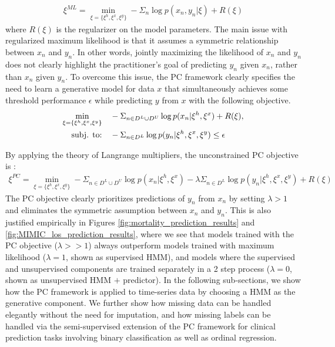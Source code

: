 \begin{align}
    \xi^{ML} = \min_{\xi=\{\xi^h, \xi^x, \xi^y\}} -\Sigma_n \log p(x_n, y_n|\xi) + R(\xi)
\end{align}
where $R(\xi)$ is the regularizer on the model parameters. 
The main issue with regularized maximum likelihood is that it assumes a symmetric relationship between $x_n$ and $y_n$. In other words, jointly maximizing the likelihood of $x_n$ and $y_n$ does not clearly highlight the practitioner's goal of predicting $y_n$ given $x_n$, rather than $x_n$ given $y_n$. To overcome this issue, the PC framework clearly specifies the need to learn a generative model for data $x$ that simultaneously achieves some threshold performance $\epsilon$ while predicting $y$ from $x$ with the following objective.
\begin{align}
\min_{\xi=\{\xi^h, \xi^x, \xi^y\}} \quad & -\Sigma_{n\in D^L \cup D^U} \log p(x_n|\xi^h, \xi^x) + R(\xi),
\\ \notag
\text{subj. to:} \quad & 
-\Sigma_{n\in D^L} \log p(y_n|\xi^h, \xi^x, \xi^y)\leq \epsilon
\end{align}

By applying the theory of Langrange multipliers, the unconstrained PC objective is :
\begin{align}
    \xi^{PC}=\min_{\xi=\{\xi^h, \xi^x, \xi^y\}} -\Sigma_{n\in D^L \cup D^U} \log p(x_n|\xi^h, \xi^x) - \lambda \Sigma_{n\in D^L} \log p(y_n|\xi^h, \xi^x, \xi^y) + R(\xi)
\end{align}
The PC objective clearly prioritizes predictions of $y_n$ from $x_n$ by setting $\lambda>1$ and eliminates the symmetric assumption between $x_n$ and $y_n$. 
This is also justified empirically in Figures \ref{fig:mortality_prediction_results} and \ref{fig:MIMIC_los_prediction_results}, where we see that models trained with the PC objective ($\lambda>>1$) always outperform models trained with maximum likelihood ($\lambda=1$, shown as supervised HMM), and models where the supervised and unsupervised components are trained separately in a 2 step process ($\lambda=0$, shown as unsupervised HMM $+$ predictor). In the following sub-sections, we show how the PC framework is applied to time-series data by choosing a HMM as the generative component. We further show how missing data can be handled elegantly without the need for imputation, and how missing labels can be handled via the semi-supervised extension of the PC framework for clinical prediction tasks involving binary classification as well as ordinal regression.

